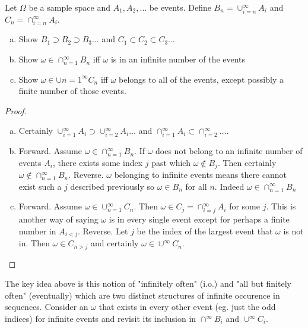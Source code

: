 \documentclass[10pt]{article}
\begin{document}
\setcounter{exercise}{2}
\begin{exercise}
    Let $\Omega$ be a sample space and $A_1, A_2, \dots$ be events. Define
    $B_n = \cup_{i=n}^{\infty} A_i$ and $C_n = \cap_{i=n}^{\infty} A_i$.
    \begin{enumerate}[(a)]
        \item{Show $B_1 \supset B_2 \supset B_3 \dots$ and $C_1 \subset C_2
            \subset C_3 \dots$}
        \item{Show $\omega \in \cap_{n=1}^{\infty} B_n$ iff $\omega$ is in an
            infinite number of the events}
        \item{Show $\omega \in \cup{n=1}^{\infty} C_n$ iff $\omega$ belongs to all
                of the events, except possibly a finite number of those
            events.}
    \end{enumerate}
\end{exercise}

\begin{proof}
    \begin{enumerate}[(a)]
        \item{Certainly $\cup_{i=1}^{\infty} A_i \supset \cup_{i=2}^{\infty} A_i \dots$ and $\cap_{i=1}^{\infty} A_i \subset \cap_{i=2}^{\infty} \dots$.}
        \item{Forward. Assume $\omega \in \cap_{n=1}^{\infty}B_n$. If $\omega$
            does not belong to an infinite number of events $A_i$, there exists
        some index $j$ past which $\omega \notin B_j$. Then certainly $\omega \notin \cap_{n=1}^{\infty}B_n$. Reverse. $\omega$ belonging to infinite events means there cannot exist such a $j$ described previously so $\omega \in B_n$ for all $n$. Indeed $\omega \in \cap_{n=1}^{\infty}B_n$}
    \item{Forward. Assume $\omega \in \cup_{n=1}^{\infty}C_n$. Then $\omega \in
        C_j = \cap_{i=j}^{\infty} A_i$ for some $j$. This is another way of
    saying $\omega$ is in every single event except for perhaps a finite number
in $A_{i < j}$. Reverse. Let $j$ be the index of the largest event that
$\omega$ is not in. Then $\omega \in C_{n > j}$ and certainly $\omega \in
\cup^{\infty}C_n$.}
    \end{enumerate}
\end{proof}

\begin{note}
    The key idea above is this notion of "infinitely often" (i.o.) and "all but finitely
    often" (eventually) which are two distinct structures of infinite occurence in
    sequences. Consider an $\omega$ that exists in every other event (eg. just the
    odd indices) for infinite events and revisit its inclusion in $\cap^{\infty}
    B_i$ and $\cup^{\infty} C_i$.
\end{note}
\end{document}
